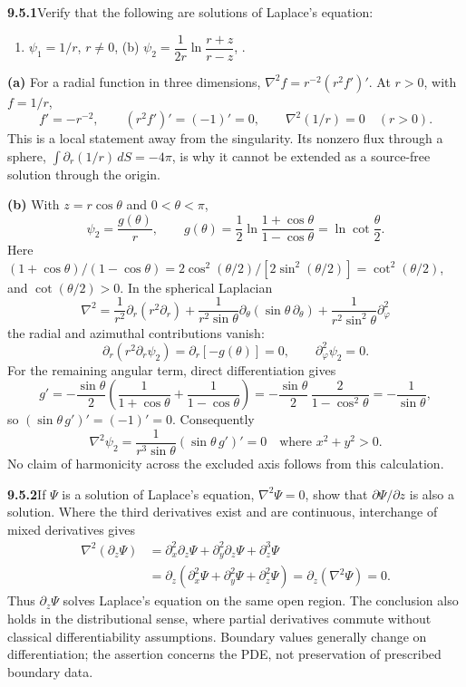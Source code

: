 \par\bigskip
\noindent\textbf{9.5.1}\quad Verify that the following are solutions of
Laplace's equation:
\begin{enumerate}
\item[(a)] $\psi_{1}=1/r$, $r\neq0$,\quad
(b) $\psi_{2}=\dfrac{1}{2r}\ln\dfrac{r+z}{r-z}$,
.
\end{enumerate}
\solution
\textbf{(a)} For a radial function in three dimensions,
$\nabla^2f=r^{-2}(r^2f')'$.  At $r>0$, with $f=1/r$,
\[
f'=-r^{-2},\qquad (r^2f')'=(-1)'=0,
\qquad \boxed{\nabla^2(1/r)=0\quad(r>0)}.
\]
This is a local statement away from the singularity.  Its nonzero
flux through a sphere, $\int\partial_r(1/r)\,dS=-4\pi$, is why it
cannot be extended as a source-free solution through the origin.

\textbf{(b)} 
With $z=r\cos\theta$ and $0<\theta<\pi$,
\[
\psi_2=\frac{g(\theta)}r,\qquad
g(\theta)=\frac12\ln\frac{1+\cos\theta}{1-\cos\theta}
=\ln\cot\frac\theta2.
\]
Here $(1+\cos\theta)/(1-\cos\theta)
=2\cos^2(\theta/2)/[2\sin^2(\theta/2)]=\cot^2(\theta/2)$, and
$\cot(\theta/2)>0$.  In the spherical Laplacian
\[
\nabla^2=\frac1{r^2}\partial_r(r^2\partial_r)
+\frac1{r^2\sin\theta}\partial_\theta(\sin\theta\,\partial_\theta)
+\frac1{r^2\sin^2\theta}\partial_\varphi^2
\]
the radial and azimuthal contributions vanish:
\[
\partial_r(r^2\partial_r\psi_2)=\partial_r[-g(\theta)]=0,
\qquad\partial_\varphi^2\psi_2=0.
\]
For the remaining angular term, direct differentiation gives
\[
g'=-\frac{\sin\theta}{2}
\left(\frac1{1+\cos\theta}+\frac1{1-\cos\theta}\right)
=-\frac{\sin\theta}{2}\,\frac{2}{1-\cos^2\theta}
=-\frac1{\sin\theta},
\]
so $(\sin\theta\,g')'=(-1)'=0$.
Consequently
\[
\boxed{\nabla^2\psi_2=
\frac1{r^3\sin\theta}(\sin\theta\,g')'=0
\quad\text{where }x^2+y^2>0}.
\]
No claim of harmonicity across the excluded axis follows from this
calculation.


\par\bigskip
\noindent\textbf{9.5.2}\quad If $\Psi$ is a solution of Laplace's equation,
$\nabla^{2}\Psi=0$, show that $\partial\Psi/\partial z$ is also a solution.
\solution
Where the third derivatives exist and are continuous, interchange of
mixed derivatives gives
\begin{align*}
\nabla^2(\partial_z\Psi)
&=\partial_x^2\partial_z\Psi+
  \partial_y^2\partial_z\Psi+\partial_z^3\Psi\\
&=\partial_z(\partial_x^2\Psi+
  \partial_y^2\Psi+\partial_z^2\Psi)
=\partial_z(\nabla^2\Psi)=0.
\end{align*}
Thus $\partial_z\Psi$ solves Laplace's equation on the same open
region.  The conclusion also holds in the distributional sense,
where partial derivatives commute without classical differentiability
assumptions.  Boundary values generally change on differentiation;
the assertion concerns the PDE, not preservation of prescribed
boundary data.


